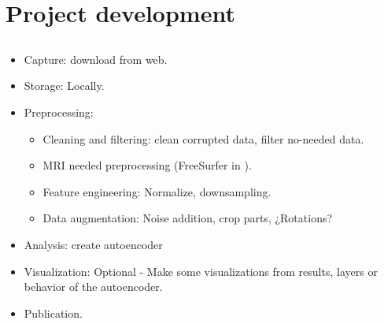 \chapter{Project development}
\label{chapter:development}

\section{}

\section{}
\label{section:datalifecycle}

\begin{itemize}
    \item Capture: download from web.
    \item Storage: Locally.
    \item Preprocessing:
    \begin{itemize}
        \item Cleaning and filtering: clean corrupted data, filter no-needed data.
        \item MRI needed preprocessing (FreeSurfer in \cite{pinaya2019}).
        \item Feature engineering: Normalize, downsampling.
        \item Data augmentation: Noise addition, crop parts, ¿Rotations?
    \end{itemize}
    \item Analysis: create autoencoder
    \item Visualization: Optional - Make some visualizations from results, layers or behavior of the autoencoder.
    \item Publication.
\end{itemize}